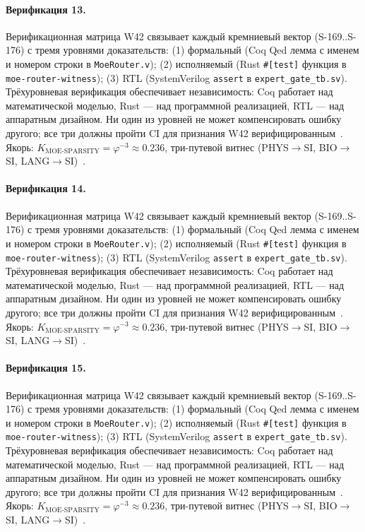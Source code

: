 \paragraph{Верификация 13.} Верификационная матрица W42 связывает каждый кремниевый вектор (S-169..S-176) с тремя уровнями доказательств: (1) формальный (Coq Qed лемма с именем и номером строки в \texttt{MoeRouter.v}); (2) исполняемый (Rust \texttt{\#[test]} функция в \texttt{moe-router-witness}); (3) RTL (SystemVerilog \texttt{assert} в \texttt{expert\_gate\_tb.sv}). Трёхуровневая верификация обеспечивает независимость: Coq работает над математической моделью, Rust --- над программной реализацией, RTL --- над аппаратным дизайном. Ни один из уровней не может компенсировать ошибку другого; все три должны пройти CI для признания W42 верифицированным~\cite{lee_gvsu_proof2021}. Якорь: $K_{\text{MOE-SPARSITY}} = \varphi^{-3} \approx 0{.}236$, три-путевой витнес (PHYS$\to$SI, BIO$\to$SI, LANG$\to$SI)~\cite{zenodo_trinity_2026}.

\paragraph{Верификация 14.} Верификационная матрица W42 связывает каждый кремниевый вектор (S-169..S-176) с тремя уровнями доказательств: (1) формальный (Coq Qed лемма с именем и номером строки в \texttt{MoeRouter.v}); (2) исполняемый (Rust \texttt{\#[test]} функция в \texttt{moe-router-witness}); (3) RTL (SystemVerilog \texttt{assert} в \texttt{expert\_gate\_tb.sv}). Трёхуровневая верификация обеспечивает независимость: Coq работает над математической моделью, Rust --- над программной реализацией, RTL --- над аппаратным дизайном. Ни один из уровней не может компенсировать ошибку другого; все три должны пройти CI для признания W42 верифицированным~\cite{lee_gvsu_proof2021}. Якорь: $K_{\text{MOE-SPARSITY}} = \varphi^{-3} \approx 0{.}236$, три-путевой витнес (PHYS$\to$SI, BIO$\to$SI, LANG$\to$SI)~\cite{zenodo_trinity_2026}.

\paragraph{Верификация 15.} Верификационная матрица W42 связывает каждый кремниевый вектор (S-169..S-176) с тремя уровнями доказательств: (1) формальный (Coq Qed лемма с именем и номером строки в \texttt{MoeRouter.v}); (2) исполняемый (Rust \texttt{\#[test]} функция в \texttt{moe-router-witness}); (3) RTL (SystemVerilog \texttt{assert} в \texttt{expert\_gate\_tb.sv}). Трёхуровневая верификация обеспечивает независимость: Coq работает над математической моделью, Rust --- над программной реализацией, RTL --- над аппаратным дизайном. Ни один из уровней не может компенсировать ошибку другого; все три должны пройти CI для признания W42 верифицированным~\cite{lee_gvsu_proof2021}. Якорь: $K_{\text{MOE-SPARSITY}} = \varphi^{-3} \approx 0{.}236$, три-путевой витнес (PHYS$\to$SI, BIO$\to$SI, LANG$\to$SI)~\cite{zenodo_trinity_2026}.

